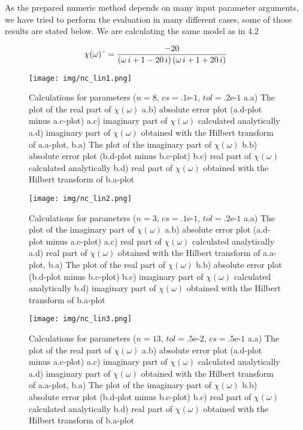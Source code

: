 \documentclass[12pt,twoside,a4paper]{article}
\numberwithin{equation}{subsection}
\numberwithin{figure}{subsection}
\begin{document}
As the prepared numeric method depends on many input parameter arguments, we have tried to perform the evaluation in many different
cases, some of those results are stated below. We are calculating the same model as in 4.2

\begin{equation} \label{eq:nc_algoritm}
  \chi (\omega ) \symbol{126} = \frac { - 20}{(\omega \,i + 1 - 20\,i)\,(\omega \,i + 1 + 20\,i)}
\end{equation} 

\begin{figure}
  \texttt{[image: img/nc\_lin1.png]}
  \caption{Calculations for parameters ($n=8, \,c s=\mbox{.1e-1}, \,tol=\mbox{.2e-1}$ 
     a.a) The plot of the real part of $\chi (\omega )$ 
     a.b) absolute error plot (a.d-plot minus a.c-plot) 
     a.c) imaginary part of $\chi (\omega )$ calculated analytically 
     a.d) imaginary part of $\chi (\omega )$ obtained with the Hilbert transform of a.a-plot, 
     b.a) The plot of the imaginary part of $\chi (\omega )$ 
     b.b) absolute error plot (b.d-plot minus b.c-plot) 
     b.c) real part of $\chi (\omega )$ calculated analytically 
     b.d) real part of $\chi (\omega )$ obtained with the Hilbert transform of b.a-plot 
     \label{fig:nc_lin1}
  }
\end{figure}

\begin{figure}
  \texttt{[image: img/nc\_lin2.png]}
  \caption{
     Calculations for parameters ($n=3, \,cs=\mbox{.1e-1}, \,tol=\mbox{.2e-1}$
     a.a) The plot of the imaginary part of $\chi (\omega )$
     a.b) absolute error plot (a.d-plot minus a.c-plot) 
     a.c) real part of $\chi (\omega )$ calculated analytically 
     a.d) real part of $\chi (\omega )$ obtained with the Hilbert transform of a.a-plot, 
     b.a) The plot of the real part of $\chi (\omega )$
     b.b) absolute error plot (b.d-plot minus b.c-plot)
     b.c) imaginary part of $\chi (\omega )$ calculated analytically 
     b.d) imaginary part of $\chi (\omega )$ obtained with the Hilbert transform of b.a-plot
     \label{fig:nc_lin2} 
  }
\end{figure}  

\begin{figure}
  \texttt{[image: img/nc\_lin3.png]}
  \caption{
    Calculations for parameters ($n=13, \,tol=\mbox{.5e-2}, \,cs=\mbox{.5e-1}$
    a.a) The plot of the real part of $\chi (\omega )$
    a.b) absolute error plot (a.d-plot minus a.c-plot) 
    a.c) imaginary part of $\chi (\omega )$ calculated analytically 
    a.d) imaginary part of $\chi (\omega )$ obtained with the Hilbert transform of a.a-plot, 
    b.a) The plot of the imaginary part of $\chi (\omega )$
    b.b) absolute error plot (b.d-plot minus b.c-plot) 
    b.c) real part of $\chi (\omega )$ calculated analytically 
    b.d) real part of $\chi (\omega )$ obtained with the Hilbert transform of b.a-plot
    \label{nc_lin3}     
  }
\end{figure}
\end{document}
